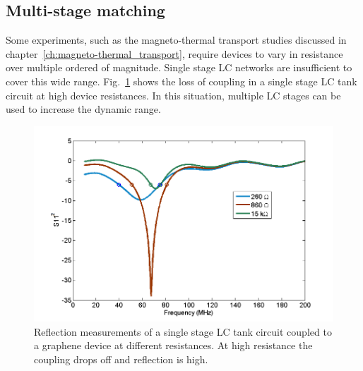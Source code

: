 \subsection{Multi-stage matching}
Some experiments, such as the magneto-thermal transport studies discussed in chapter~\ref{ch:magneto-thermal_transport}, require devices to vary in resistance over multiple ordered of magnitude. Single stage LC networks are insufficient to cover this wide range. Fig.~\ref{fig:S11_3Rs} shows the loss of coupling in a single stage LC tank circuit at high device resistances. In this situation, multiple LC stages can be used to increase the dynamic range.
\begin{figure}
\centering
\includegraphics[width = 120mm]{figures/Johnson_noise_thermometry/S11_3Rs.png}
\caption{Reflection measurements of a single stage LC tank circuit coupled to a graphene device at different resistances. At high resistance the coupling drops off and reflection is high.}
\label{fig:S11_3Rs}
\end{figure}

